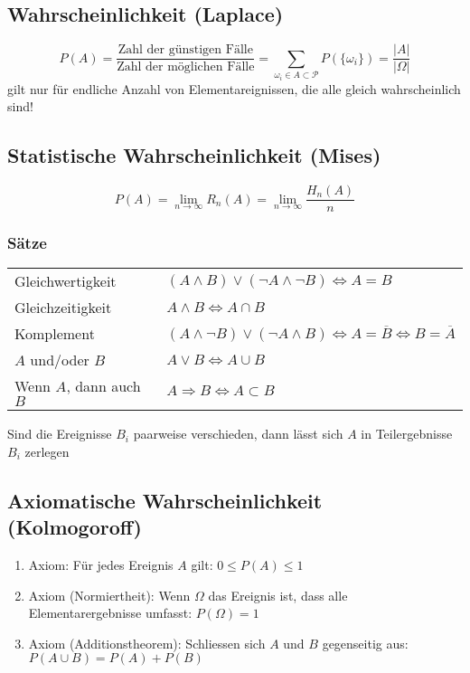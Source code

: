 \subsection{Wahrscheinlichkeit (Laplace)}
\begin{equation*}
	P(A) = \frac{\mbox{Zahl der günstigen Fälle}}{\mbox{Zahl der möglichen Fälle}} = \sum_{\omega_i \in A \subset \mathcal{P}} P(\{\omega_i\}) = \frac{|A|}{|\Omega|}
\end{equation*}
gilt nur für endliche Anzahl von Elementareignissen, die alle gleich wahrscheinlich sind! 

\subsection{Statistische Wahrscheinlichkeit (Mises)}
\begin{equation*}
	P(A) = \lim_{n \rightarrow \infty} R_n(A) = \lim_{n \rightarrow \infty} \frac{H_n(A)}{n}
\end{equation*}


\subsubsection{Sätze}
\settowidth{\MyLenA}{Wenn $A$, dann auch $B$ ~~}
\begin{tabular}{@{}p{\the\MyLenA}%
				@{}p{(\linewidth - \the\MyLenA)}}
	Gleichwertigkeit & $(A \wedge B) \vee (\neg A \wedge \neg B) \Leftrightarrow A = B$\\
	Gleichzeitigkeit & $A \wedge B \Leftrightarrow A \cap B$\\
	Komplement & $(A \wedge \neg B) \vee (\neg A \wedge B) \Leftrightarrow A = \overline{B} \Leftrightarrow B = \overline{A}$\\
	$A$ und/oder $B$ & $A \vee B \Leftrightarrow A \cup B$\\
	Wenn $A$, dann auch $B$ & $A \Rightarrow B \Leftrightarrow A \subset B$\\
\end{tabular}
Sind die Ereignisse $B_i$ paarweise verschieden, dann lässt sich $A$ in Teilergebnisse $B_i$ zerlegen 


\subsection{Axiomatische Wahrscheinlichkeit (Kolmogoroff)}
\begin{enumerate}\itemsep0em
	\item Axiom: Für jedes Ereignis $A$ gilt: $0 \leq P(A) \leq 1$
	\item Axiom (Normiertheit): Wenn $\Omega$ das Ereignis ist, dass alle Elementarergebnisse umfasst: $P(\Omega) = 1$
	\item Axiom (Additionstheorem): Schliessen sich $A$ und $B$ gegenseitig aus: $P(A \cup B) = P(A) + P(B)$ 
\end{enumerate}


